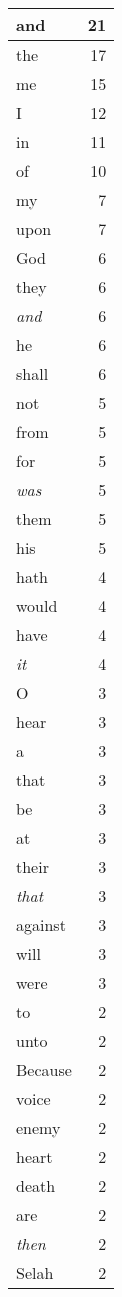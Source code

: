 \begin{center}
\begin{longtable}{l|r}
\hline \hline
\endlastfoot
and & 21 \\ \hline
the & 17 \\ \hline
me & 15 \\ \hline
I & 12 \\ \hline
in & 11 \\ \hline
of & 10 \\ \hline
my & 7 \\ \hline
upon & 7 \\ \hline
God & 6 \\ \hline
they & 6 \\ \hline
\emph{and} & 6 \\ \hline
he & 6 \\ \hline
shall & 6 \\ \hline
not & 5 \\ \hline
from & 5 \\ \hline
for & 5 \\ \hline
\emph{was} & 5 \\ \hline
them & 5 \\ \hline
his & 5 \\ \hline
hath & 4 \\ \hline
would & 4 \\ \hline
have & 4 \\ \hline
\emph{it} & 4 \\ \hline
O & 3 \\ \hline
hear & 3 \\ \hline
a & 3 \\ \hline
that & 3 \\ \hline
be & 3 \\ \hline
at & 3 \\ \hline
their & 3 \\ \hline
\emph{that} & 3 \\ \hline
against & 3 \\ \hline
will & 3 \\ \hline
were & 3 \\ \hline
to & 2 \\ \hline
unto & 2 \\ \hline
Because & 2 \\ \hline
voice & 2 \\ \hline
enemy & 2 \\ \hline
heart & 2 \\ \hline
death & 2 \\ \hline
are & 2 \\ \hline
\emph{then} & 2 \\ \hline
Selah & 2 \\ \hline

\end{longtable}
\end{center}
